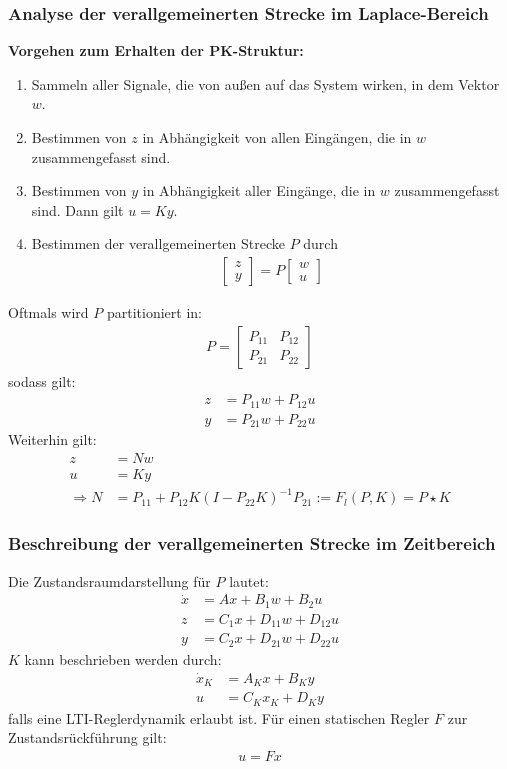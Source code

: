 \documentclass[a4paper,twocolumn,10pt]{article}
\begin{document}
\subsubsection{Analyse der verallgemeinerten Strecke im Laplace-Bereich}
\textbf{Vorgehen zum Erhalten der PK-Struktur:}
\begin{enumerate}
\item Sammeln aller Signale, die von außen auf das System wirken, in dem Vektor $w$.
\item Bestimmen von $z$ in Abhängigkeit von allen Eingängen, die in $w$ zusammengefasst sind.
\item Bestimmen von $y$ in Abhängigkeit aller Eingänge, die in $w$ zusammengefasst sind. Dann gilt $u=Ky$.
\item Bestimmen der verallgemeinerten Strecke $P$ durch
\begin{align*}
\begin{bmatrix}z \\ y\end{bmatrix}=P\begin{bmatrix}w \\ u\end{bmatrix}
\end{align*}
\end{enumerate}
Oftmals wird $P$ partitioniert in:
\begin{align*}
P=\begin{bmatrix}P_{11} & P_{12} \\ P_{21} & P_{22}\end{bmatrix}
\end{align*}
sodass gilt:
\begin{align*}
z&=P_{11}w+P_{12}u\\
y&=P_{21}w+P_{22}u
\end{align*}
Weiterhin gilt:
\begin{align*}
z&=Nw\\
u&=Ky\\
\Rightarrow N&=P_{11}+P_{12}K(I-P_{22}K)^{-1}P_{21}:=F_l(P,K)=P\star K
\end{align*}

\subsubsection{Beschreibung der verallgemeinerten Strecke im Zeitbereich}
Die Zustandsraumdarstellung für $P$ lautet:
\begin{align*}
\dot{x}&=Ax+B_1w+B_2u\\
z&=C_1x+D_{11}w+D_{12}u\\
y&=C_2x+D_{21}w+D_{22}u
\end{align*}
$K$ kann beschrieben werden durch:
\begin{align*}
\dot{x}_K&=A_Kx+B_Ky\\
u&=C_Kx_K+D_Ky
\end{align*}
falls eine LTI-Reglerdynamik erlaubt ist. Für einen statischen Regler $F$ zur Zustandsrückführung gilt:
\begin{align*}
u=Fx
\end{align*}
\end{document}
